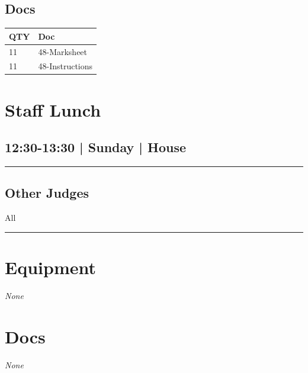 \documentclass[10pt, A5]{article}
\begin{document}
\begin{framed}
\begin{minipage}{\textwidth}
\begin{multicols}{2}
		\vfill\null
		\columnbreak

			\section*{\faFile \: Docs}
		 	\begin{center}
			\begin{tabular}{p{2cm}p{4cm}}

			\textbf{QTY} & \textbf{Doc} \\\toprule
										11&48-Marksheet\\\midrule
										11&48-Instructions\\\midrule
							\end{tabular}
			\end{center}
	

		\vfill\null

		\end{multicols}
\end{minipage}
\end{framed}
        \begin{framed}
        \begin{minipage}{\textwidth}

        \setcounter{section}{81}
        \section{Staff Lunch}
        \subsection*{12:30-13:30 | Sunday | House}

        \vspace{0.25cm}
        \hrule
        \vspace{0.25cm}


        \subsection*{Other Judges}
                    All

            \vspace{0.25cm}
        \hrule
        \vspace{0.25cm}

        \begin{multicols}{2}

		\section*{\faWrench \: Equipment}

				\textit{None}
		
		\vfill\null
		\columnbreak

			\section*{\faFile \: Docs}
		 	\textit{None}
	

		\vfill\null

		\end{multicols}
\end{minipage}
\end{framed}
\end{document}
